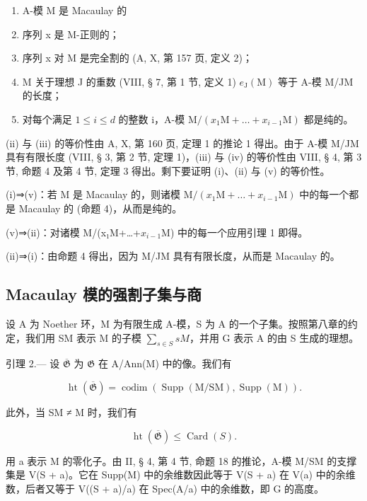 \begin{enumerate}
\def\labelenumi{(\roman{enumi})}
\item
  A-模 M 是 Macaulay 的
\item
  序列 x 是 M-正则的；
\item
  序列 x 对 M 是完全割的 (A, X, 第 157 页, 定义 2)；
\item
  M 关于理想 J 的重数 (VIII, § 7, 第 1 节, 定义 1) \(e_{\mathrm{J}}(\mathrm{M})\) 等于 A-模 M/JM 的长度；
\item
  对每个满足 \(1 \leqslant i \leqslant d\) 的整数 i，A-模 \(\mathrm{M}/(x_{1}\mathrm{M}+\ldots+x_{i-1}\mathrm{M})\) 都是纯的。
\end{enumerate}

(ii) 与 (iii) 的等价性由 A, X, 第 160 页, 定理 1 的推论 1 得出。由于 A-模 M/JM 具有有限长度 (VIII, § 3, 第 2 节, 定理 1)，(iii) 与 (iv) 的等价性由 VIII, § 4, 第 3 节, 命题 4 及第 4 节, 定理 3 得出。剩下要证明 (i)、(ii) 与 (v) 的等价性。

(i)⇒(v)：若 M 是 Macaulay 的，则诸模 \(\mathrm{M}/(x_{1}\mathrm{M}+\ldots+x_{i-1}\mathrm{M})\) 中的每一个都是 Macaulay 的 (命题 4)，从而是纯的。

(v)⇒(ii)：对诸模 M/(x₁M+\ldots+\(x_{i-1}\){}M) 中的每一个应用引理 1 即得。

(ii)⇒(i)：由命题 4 得出，因为 M/JM 具有有限长度，从而是 Macaulay 的。

\subsection{Macaulay 模的强割子集与商}

设 A 为 Noether 环，M 为有限生成 A-模，S 为 A 的一个子集。按照第八章的约定，我们用 SM 表示 M 的子模 \(\sum_{s\in S}sM\)，并用 G 表示 A 的由 S 生成的理想。

引理 2.--- 设 \(\overline{\mathfrak{G}}\) 为 \(\mathfrak{G}\) 在 A/Ann(M) 中的像。我们有

\[
\operatorname{ht} (\overline {{\mathfrak {G}}}) = \operatorname{codim} (\operatorname{Supp} (\mathrm{M} / \mathrm{SM}), \operatorname{Supp} (\mathrm{M})) .
\]

此外，当 SM ≠ M 时，我们有

\[
\operatorname{ht} (\overline {{{\mathfrak {G}}}}) \leqslant \operatorname{Card} (S).
\]

用 a 表示 M 的零化子。由 II, § 4, 第 4 节, 命题 18 的推论，A-模 M/SM 的支撑集是 V(S + a)。它在 Supp(M) 中的余维数因此等于 V(S + a) 在 V(a) 中的余维数，后者又等于 V((S + a)/a) 在 Spec(A/a) 中的余维数，即 G 的高度。

